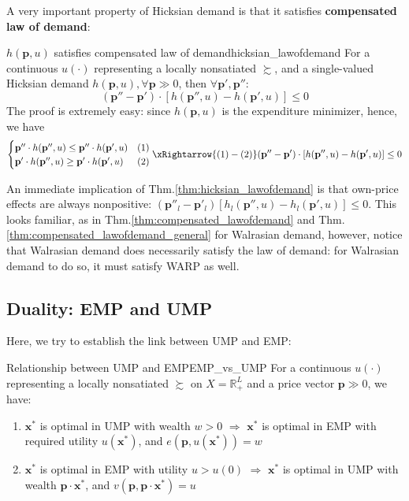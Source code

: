 A very important property of Hicksian demand is that it satisfies \textbf{compensated law of demand}:
\begin{theorem}{$h(\mathbf{p},u)$ satisfies compensated law of demand}{hicksian_lawofdemand}
    For a continuous $u(\cdot)$ representing a locally nonsatiated $\succsim$, and a single-valued Hicksian demand $h(\mathbf{p},u),\forall \mathbf{p}\gg 0$, then $\forall \mathbf{p}',\mathbf{p}''$:
    $$(\mathbf{p}''-\mathbf{p}')\cdot [h(\mathbf{p}'',u)-h(\mathbf{p}',u)]\leq 0$$
    The proof is extremely easy: since $h(\mathbf{p},u)$ is the expenditure minimizer, hence, we have
    $$
    \begin{cases}
        \mathbf{p}''\cdot h(\mathbf{p}'',u) \leq \mathbf{p}''\cdot h(\mathbf{p}',u) &(1)\\
        \mathbf{p}'\cdot h(\mathbf{p}'',u) \geq \mathbf{p}'\cdot h(\mathbf{p}',u)&(2)
    \end{cases}\xRightarrow{(1)-(2)}(\mathbf{p}''-\mathbf{p}')\cdot [h(\mathbf{p}'',u)-h(\mathbf{p}',u)]\leq 0
    $$
\end{theorem}
An immediate implication of Thm.\ref{thm:hicksian_lawofdemand} is that own-price effects are always nonpositive: $(\mathbf{p}''_l-\mathbf{p}'_l)[h_l(\mathbf{p}'',u)-h_l(\mathbf{p}',u)]\leq 0$.
This looks familiar, as in Thm.\ref{thm:compensated_lawofdemand} and Thm.\ref{thm:compensated_lawofdemand_general} for Walrasian demand, however, notice that Walrasian demand does  necessarily satisfy the law of demand: for Walrasian demand to do so, it must satisfy WARP as well.

\subsection{Duality: EMP and UMP}
Here, we try to establish the link between UMP and EMP:
\begin{theorem}{Relationship between UMP and EMP}{EMP_vs_UMP}
    For a continuous $u(\cdot)$ representing a locally nonsatiated $\succsim$ on $X=\mathbb{R}^L_+$ and a price vector $\mathbf{p}\gg 0$, we have:
    \begin{enumerate}
        \item $\mathbf{x}^*$ is optimal in UMP with wealth $w>0$ $\Rightarrow$ $\mathbf{x}^*$ is optimal in EMP with required utility $u(\mathbf{x}^*)$, and $e(\mathbf{p},u(\mathbf{x}^*))=w$
        \item $\mathbf{x}^*$ is optimal in EMP with utility $u>u(0)$ $\Rightarrow$ $\mathbf{x}^*$ is optimal in UMP with wealth $\mathbf{p}\cdot\mathbf{x}^*$, and $v(\mathbf{p},\mathbf{p}\cdot\mathbf{x}^*)=u$
    \end{enumerate}
\end{theorem}

